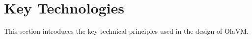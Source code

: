 \section{Key Technologies} \label{sec:key-technologies}

This section introduces the key technical principles used in the design of OlaVM.





